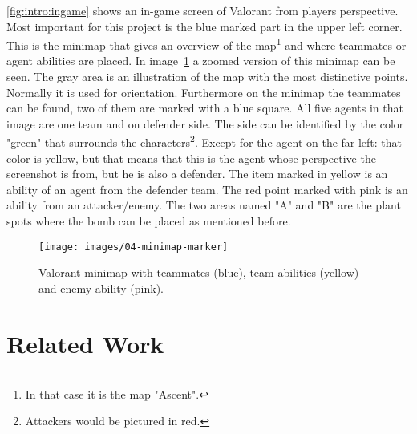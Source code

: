 \autoref{fig:intro:ingame} shows an in-game screen of Valorant from players perspective. Most 
important for this project is the blue marked part in the upper left corner. This is the minimap that 
gives an overview of the map\footnote{In that case it is the map "Ascent".} and where teammates or 
agent abilities are placed. In image~\ref{fig:intro:minimap} a zoomed version of this minimap can be 
seen. The gray area is an illustration of the map with the most distinctive points. Normally it is used 
for orientation. Furthermore on the minimap the teammates can be found, two of them are marked 
with a blue square. All five agents in that image are one team and on defender side. The side can be 
identified by the color "green" that surrounds the characters\footnote{Attackers would be pictured 
in red.}.  Except for the agent on the far left: that color is yellow, but that means that this is the agent 
whose perspective the screenshot is from, but he is also a defender. The item marked in yellow is an 
ability of an agent from the defender team. The red point marked with pink is an ability from an 
attacker/enemy. The two areas named "A" and "B" are the plant spots where the bomb can be 
placed as mentioned before.

\begin{figure}
	\centering
	\texttt{[image: images/04-minimap-marker]}
	\caption[Valorant minimap]{Valorant minimap with teammates (blue), team abilities (yellow) and 
	enemy ability (pink).}
	\label{fig:intro:minimap}
\end{figure}


\section{Related Work}\label{sec:intro:relatedWork}
